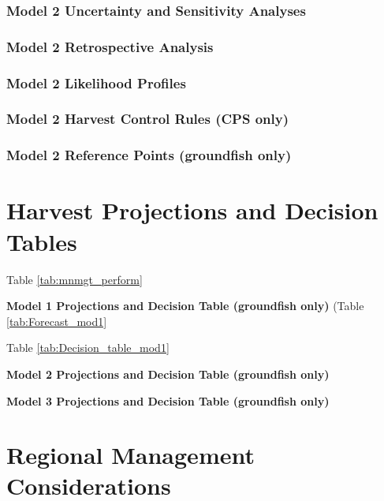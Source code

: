 \documentclass[12pt,]{article}
\begin{document}
\subsubsection{Model 2 Uncertainty and Sensitivity
Analyses}\label{model-2-uncertainty-and-sensitivity-analyses}

\subsubsection{Model 2 Retrospective
Analysis}\label{model-2-retrospective-analysis}

\subsubsection{Model 2 Likelihood
Profiles}\label{model-2-likelihood-profiles}

\subsubsection{Model 2 Harvest Control Rules (CPS
only)}\label{model-2-harvest-control-rules-cps-only}

\subsubsection{Model 2 Reference Points (groundfish
only)}\label{model-2-reference-points-groundfish-only}

\newpage

\section{Harvest Projections and Decision
Tables}\label{harvest-projections-and-decision-tables}

Table \ref{tab:mnmgt_perform}

\textbf{Model 1 Projections and Decision Table (groundfish only)} (Table
\ref{tab:Forecast_mod1}

Table \ref{tab:Decision_table_mod1}

\textbf{Model 2 Projections and Decision Table (groundfish only)}

\textbf{Model 3 Projections and Decision Table (groundfish only)}

\newpage

\section{Regional Management
Considerations}\label{regional-management-considerations}
\end{document}
